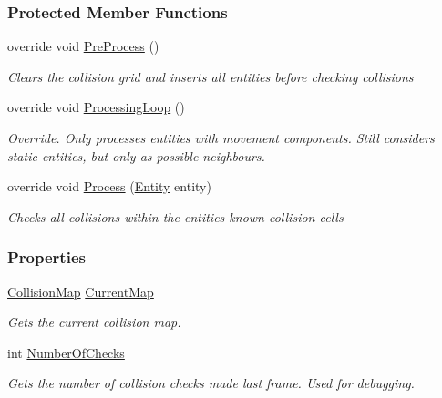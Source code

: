 \subsubsection*{Protected Member Functions}
\begin{DoxyCompactItemize}
\item 
override void \hyperlink{class_m_b2_d_1_1_entity_component_1_1_collision_system_ad591227767c8b6c66ca3891de04e9050}{Pre\+Process} ()
\begin{DoxyCompactList}\small\item\em Clears the collision grid and inserts all entities before checking collisions \end{DoxyCompactList}\item 
override void \hyperlink{class_m_b2_d_1_1_entity_component_1_1_collision_system_a06249adc606475cdc35f28783a1b27c4}{Processing\+Loop} ()
\begin{DoxyCompactList}\small\item\em Override. Only processes entities with movement components. Still considers static entities, but only as possible neighbours. \end{DoxyCompactList}\item 
override void \hyperlink{class_m_b2_d_1_1_entity_component_1_1_collision_system_adfbee070ed7b120565a5f8a08c159535}{Process} (\hyperlink{class_m_b2_d_1_1_entity_component_1_1_entity}{Entity} entity)
\begin{DoxyCompactList}\small\item\em Checks all collisions within the entities known collision cells \end{DoxyCompactList}\end{DoxyCompactItemize}
\subsubsection*{Properties}
\begin{DoxyCompactItemize}
\item 
\hyperlink{class_m_b2_d_1_1_collision_1_1_collision_map}{Collision\+Map} \hyperlink{class_m_b2_d_1_1_entity_component_1_1_collision_system_a338aebc3f288cf68926074026af3dbba}{Current\+Map}
\begin{DoxyCompactList}\small\item\em Gets the current collision map. \end{DoxyCompactList}\item 
int \hyperlink{class_m_b2_d_1_1_entity_component_1_1_collision_system_a9448df47918780c8287b6f7ff177d46f}{Number\+Of\+Checks}
\begin{DoxyCompactList}\small\item\em Gets the number of collision checks made last frame. Used for debugging. \end{DoxyCompactList}\end{DoxyCompactItemize}
